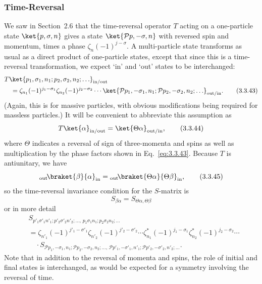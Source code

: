 \subsubsection*{Time-Reversal}

We saw in Section~2.6 that the time-reversal operator $T$ acting on a
one-particle state $\ket{p,\sigma,n}$ gives a state
$\ket{\mathcal{P}p,-\sigma,n}$ with reversed spin and momentum, times a phase
$\zeta_n(-1)^{j-\sigma}$. A multi-particle state transforms as usual as a direct
product of one-particle states, except that since this is a time-reversal
transformation, we expect `in' and `out' states to be interchanged:
\begin{align}
&T\ket{p_1,\sigma_1,n_1;p_2,\sigma_2,n_2;\ldots}_{\mathrm{in/out}}
\nonumber\\
&\quad=\zeta_{n_1}(-1)^{j_1-\sigma_1}
\zeta_{n_2}(-1)^{j_2-\sigma_2}\cdots
\ket{\mathcal{P}p_1,-\sigma_1,n_1;
\mathcal{P}p_2,-\sigma_2,n_2;\ldots}_{\mathrm{out/in}}.
\tag{3.3.43}\label{eq:3.3.43}
\end{align}
(Again, this is for massive particles, with obvious modifications being required
for massless particles.) It will be convenient to abbreviate this assumption as
\begin{equation}
T\ket{\alpha}_{\mathrm{in/out}}=\ket{\Theta\alpha}_{\mathrm{out/in}},
\tag{3.3.44}\label{eq:3.3.44}
\end{equation}
where $\Theta$ indicates a reversal of sign of three-momenta and spins as well as
multiplication by the phase factors shown in Eq.~\eqref{eq:3.3.43}. Because $T$ is
antiunitary, we have
\begin{equation}
{}_{\mathrm{out}}\!\braket{\beta}{\alpha}_{\mathrm{in}}
={}_{\mathrm{out}}\!\braket{\Theta\alpha}{\Theta\beta}_{\mathrm{in}},
\tag{3.3.45}\label{eq:3.3.45}
\end{equation}
so the time-reversal invariance condition for the $S$-matrix is
\begin{equation}
S_{\beta\alpha}=S_{\Theta\alpha,\Theta\beta}
\tag{3.3.46}\label{eq:3.3.46}
\end{equation}
or in more detail
\begin{align}
&S_{p'_1\sigma'_1n'_1;p'_2\sigma'_2n'_2;\ldots,\,
p_1\sigma_1n_1;p_2\sigma_2n_2;\ldots}
\nonumber\\
&=\zeta_{n'_1}(-1)^{j'_1-\sigma'_1}
\zeta_{n'_2}(-1)^{j'_2-\sigma'_2}\cdots
\zeta^*_{n_1}(-1)^{j_1-\sigma_1}
\zeta^*_{n_2}(-1)^{j_2-\sigma_2}\cdots
\nonumber\\
&\quad\cdot
S_{\mathcal{P}p_1,-\sigma_1,n_1;\mathcal{P}p_2,-\sigma_2,n_2;\ldots,\,
\mathcal{P}p'_1,-\sigma'_1,n'_1;\mathcal{P}p'_2,-\sigma'_2,n'_2;\ldots}.
\tag{3.3.47}\label{eq:3.3.47}
\end{align}
Note that in addition to the reversal of momenta and spins, the role of initial and
final states is interchanged, as would be expected for a symmetry involving the
reversal of time.

